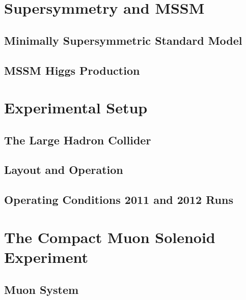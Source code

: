 \documentclass[oneside, letterpaper, 12pt, oldfontcommands]{memoir}
\begin{document}
\chapter{Supersymmetry and MSSM}
\section{Minimally Supersymmetric Standard Model}
\section{MSSM Higgs Production}

\chapter{Experimental Setup}
\section{The Large Hadron Collider}
\section{Layout and Operation}
\section{Operating Conditions 2011 and 2012 Runs}

\chapter{The Compact Muon Solenoid Experiment}
 
 
 
 
 
 \section{Muon System}
 
\end{document}
